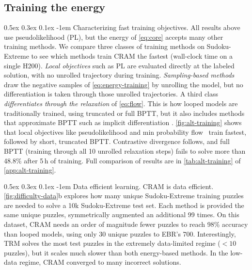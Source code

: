 \documentclass{article}
\makeatletter
\newcommand{\CRAM}{\textsc{CRAM}}
\newcommand{\BPTT}{BPTT}
\renewcommand{\paragraph}{%
  \@startsection{paragraph}{4}{\z@}%
                {0.5ex \@plus 0.3ex \@minus 0.1ex}%
                {-1em}%
                {\normalsize\bf}%
}
\makeatother
\begin{document}
\subsection{Training the energy}
\label{sec:training-results}

\paragraph{Characterizing fast training objectives.}
All results above use pseudolikelihood (PL), but the energy of \cref{eq:core} accepts many other training methods.
We compare three classes of training methods on Sudoku-Extreme to see which methods train \CRAM{} the fastest (wall-clock time on a single H200).
\emph{Local objectives} such as PL are evaluated directly at the labeled solution, with no unrolled trajectory during training.
\emph{Sampling-based methods} draw the negative samples of \cref{eq:energy-training} by unrolling the model, but no differentiation is taken through those unrolled trajectories.
A third class \emph{differentiates through the relaxation} of \cref{eq:flow}. This is how looped models are traditionally trained, using truncated or full BPTT, but it also includes methods that approximate BPTT such as implicit differentiation \citep{pineda1987,deq2019}.
\cref{fig:alt-training} shows that local objectives like pseudolikelihood and min probability flow~\cite{sohldickstein2011} train fastest, followed by short, truncated \BPTT{}. Contrastive divergence follows, and full \BPTT{} (training through all 10 unrolled relaxation steps) fails to solve more than 48.8\% after 5\,h of training.
Full comparison of results are in \cref{tab:alt-training} of  \cref{app:alt-training}.

\paragraph{Data efficient learning.}
\label{sec:data-efficiency}
\CRAM{} is data efficient. \cref{fig:difficulty-data}b explores how many unique Sudoku-Extreme training puzzles are needed to solve a 10k Sudoku-Extreme test set.
Each method is provided the same unique puzzles, symmetrically augmented an additional 99 times.
On this dataset, \CRAM{} needs an order of magnitude fewer puzzles to reach 98\% accuracy than looped models, using only 30 unique puzzles to EBR's 700. Interestingly, TRM solves the most test puzzles in the extremely data-limited regime ($<10$ puzzles), but it scales much slower than both energy-based methods. 
In the low-data regime, \CRAM{} converged to many incorrect solutions.
\end{document}
